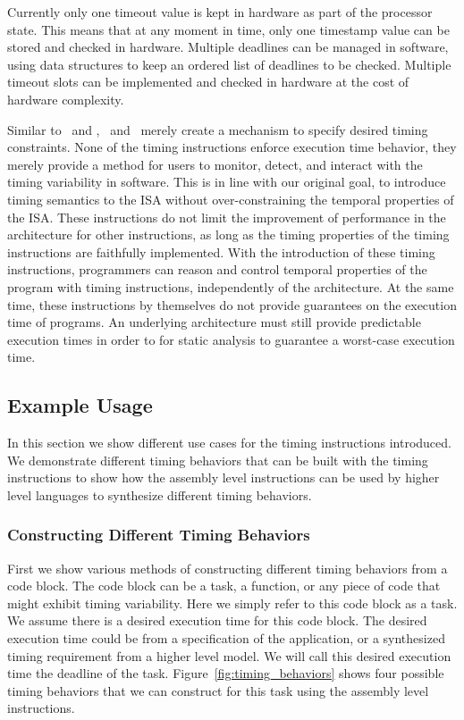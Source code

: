 Currently only one timeout value is kept in hardware as part of the processor state.
This means that at any moment in time, only one timestamp value can be stored and checked in hardware.
Multiple deadlines can be managed in software, using data structures to keep an ordered list of deadlines to be checked. 
Multiple timeout slots can be implemented and checked in hardware at the cost of hardware complexity.

\bigskip

Similar to \delayandset\ and \delayuntil, \exceptiononexpire\ and \deactivateexception\ merely create a mechanism to specify desired timing constraints. 
None of the timing instructions enforce execution time behavior, they merely provide a method for users to monitor, detect, and interact with the timing variability in software.     
This is in line with our original goal, to introduce timing semantics to the ISA without over-constraining the temporal properties of the ISA.
These instructions do not limit the improvement of performance in the architecture for other instructions, as long as the timing properties of the timing instructions are faithfully implemented.  
With the introduction of these timing instructions, programmers can reason and control temporal properties of the program with timing instructions, independently of the architecture. 
At the same time, these instructions by themselves do not provide guarantees on the execution time of programs.
An underlying architecture must still provide predictable execution times in order to for static analysis to guarantee a worst-case execution time.     

\subsection{Example Usage}
\label{sec:timing_instruction_usage_notes}
In this section we show different use cases for the timing instructions introduced.  
We demonstrate different timing behaviors that can be built with the timing instructions to show how the assembly level instructions can be used by higher level languages to synthesize different timing behaviors.

\subsubsection{Constructing Different Timing Behaviors}
First we show various methods of constructing different timing behaviors from a code block.
The code block can be a task, a function, or any piece of code that might exhibit timing variability.
Here we simply refer to this code block as a task.    
We assume there is a desired execution time for this code block. 
The desired execution time could be from a specification of the application, or a synthesized timing requirement from a higher level model.
We will call this desired execution time the deadline of the task.
Figure~\ref{fig:timing_behaviors} shows four possible timing behaviors that we can construct for this task using the assembly level instructions.  

